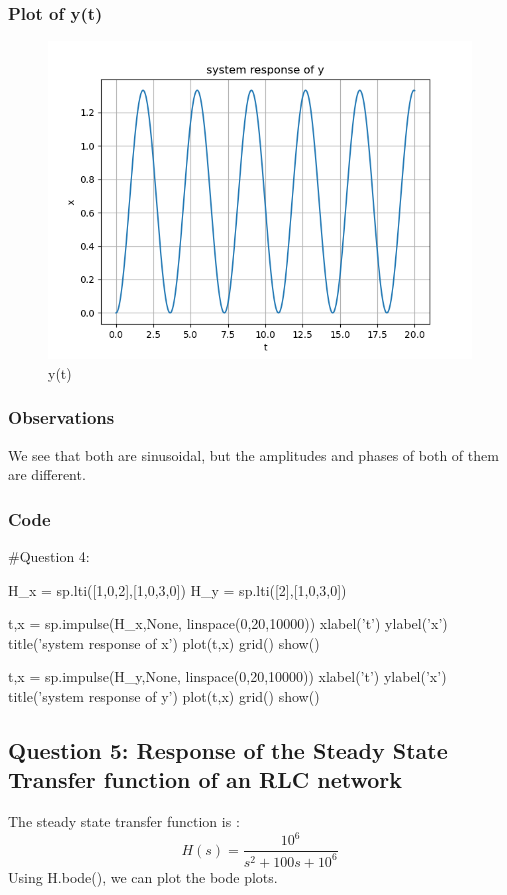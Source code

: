 \documentclass[11pt]{article}
\begin{document}
\subsubsection{Plot of y(t)}
\begin{figure}[H]
    \centering
    \includegraphics[scale = 1]{Figure_9.png}
    \caption{y(t)}
\end{figure}

\subsubsection{Observations}
We see that both are sinusoidal, but the amplitudes and phases of both of them are different.

\subsubsection{Code}
\begin{python}
#Question 4:

H_x = sp.lti([1,0,2],[1,0,3,0])
H_y = sp.lti([2],[1,0,3,0])

t,x = sp.impulse(H_x,None, linspace(0,20,10000))
xlabel('t')
ylabel('x')
title('system response of x')
plot(t,x)
grid()
show()

t,x = sp.impulse(H_y,None, linspace(0,20,10000))
xlabel('t')
ylabel('x')
title('system response of y')
plot(t,x)
grid()
show()
\end{python}

\subsection{Question 5: Response of the Steady State Transfer function of an RLC network}
The steady state transfer function is :
\begin{equation}
    H(s) = \frac{10^6}{s^2 + 100s + 10^6}
\end{equation}
Using H.bode(), we can plot the bode plots.
\end{document}
